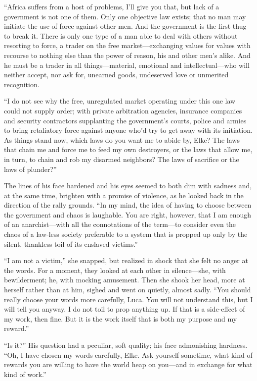``Africa suffers from a host of problems, I'll give you that, but lack of a government is not one of them. Only one objective law exists; that no man may initiate the use of force against other men. And the government is the first thug to break it. There is only one type of a man able to deal with others without resorting to force, a trader on the free market---exchanging values for values with recourse to nothing else than the power of reason, his and other men's alike. And he must be a trader in all things---material, emotional and intellectual---who will neither accept, nor ask for, unearned goods, undeserved love or unmerited recognition.

``I do not see why the free, unregulated market operating under this one law could not supply order; with private arbitration agencies, insurance companies and security contractors supplanting the government's courts, police and armies to bring retaliatory force against anyone who'd try to get away with its initiation. As things stand now, which laws do you want me to abide by, Elke? The laws that chain me and force me to feed my own destroyers, or the laws that allow me, in turn, to chain and rob my disarmed neighbors? The laws of sacrifice or the laws of plunder?''

The lines of his face hardened and his eyes seemed to both dim with sadness and, at the same time, brighten with a promise of violence, as he looked back in the direction of the rally grounds. ``In my mind, the idea of having to choose between the government and chaos is laughable. You are right, however, that I am enough of an anarchist---with all the connotations of the term---to consider even the chaos of a law-less society preferable to a system that is propped up only by the silent, thankless toil of its enslaved victims.''

``I am not a victim,'' she snapped, but realized in shock that she felt no anger at the words. For a moment, they looked at each other in silence---she, with bewilderment; he, with mocking amusement. Then she shook her head, more at herself rather than at him, sighed and went on quietly, almost sadly. ``You should really choose your words more carefully, Luca. You will not understand this, but I will tell you anyway. I do not toil to prop anything up. If that is a side-effect of my work, then fine. But it is the work itself that is both my purpose and my reward.''

``Is it?'' His question had a peculiar, soft quality; his face admonishing hardness. ``Oh, I have chosen my words carefully, Elke. Ask yourself sometime, what kind of rewards you are willing to have the world heap on you---and in exchange for what kind of work.''

